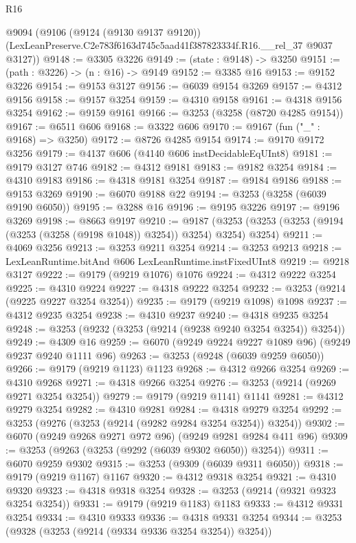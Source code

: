 \begin{lexlean}{R16}
\begin{coremodule}
  @9094
    (@9106
      (@9124 (@9130 @9137 @9120))
      (LexLeanPreserve.C2e783f6163d745c5aad41f387823334f.R16.__rel_37 @9037 @3127))
@9148 := @3305 @3226
@9149 := (state : @9148) -> @3250
@9151 := (path : @3226) -> (n : @16) -> @9149
@9152 := @3385 @16
@9153 := @9152 @3226
@9154 := @9153 @3127
@9156 := @6039 @9154 @3269
@9157 := @4312 @9156
@9158 := @9157 @3254
@9159 := @4310 @9158
@9161 := @4318 @9156 @3254
@9162 := @9159 @9161
@9166 := @3253 (@3258 (@8720 @4285 @9154))
@9167 := @6511 @606
@9168 := @3322 @606
@9170 := @9167 (fun ("_" : @9168) => @3250)
@9172 := @8726 @4285 @9154
@9174 := @9170 @9172 @3256
@9179 := @4137 @606 (@4140 @606 instDecidableEqUInt8)
@9181 := @9179 @3127 @746
@9182 := @4312 @9181
@9183 := @9182 @3254
@9184 := @4310 @9183
@9186 := @4318 @9181 @3254
@9187 := @9184 @9186
@9188 := @9153 @3269
@9190 := @6070 @9188 @22
@9194 := @3253 (@3258 (@6039 @9190 @6050))
@9195 := @3288 @16
@9196 := @9195 @3226
@9197 := @9196 @3269
@9198 := @8663 @9197
@9210 := @9187 (@3253 (@3253 (@3253 (@9194 (@3253 (@3258 (@9198 @1048)) @3254)) @3254) @3254) @3254)
@9211 := @4069 @3256
@9213 := @3253 @9211 @3254
@9214 := @3253 @9213
@9218 := LexLeanRuntime.bitAnd @606 LexLeanRuntime.instFixedUInt8
@9219 := @9218 @3127
@9222 := @9179 (@9219 @1076) @1076
@9224 := @4312 @9222 @3254
@9225 := @4310 @9224
@9227 := @4318 @9222 @3254
@9232 := @3253 (@9214 (@9225 @9227 @3254 @3254))
@9235 := @9179 (@9219 @1098) @1098
@9237 := @4312 @9235 @3254
@9238 := @4310 @9237
@9240 := @4318 @9235 @3254
@9248 := @3253 (@9232 (@3253 (@9214 (@9238 @9240 @3254 @3254)) @3254))
@9249 := @4309 @16
@9259 := @6070 (@9249 @9224 @9227 @1089 @96) (@9249 @9237 @9240 @1111 @96)
@9263 := @3253 (@9248 (@6039 @9259 @6050))
@9266 := @9179 (@9219 @1123) @1123
@9268 := @4312 @9266 @3254
@9269 := @4310 @9268
@9271 := @4318 @9266 @3254
@9276 := @3253 (@9214 (@9269 @9271 @3254 @3254))
@9279 := @9179 (@9219 @1141) @1141
@9281 := @4312 @9279 @3254
@9282 := @4310 @9281
@9284 := @4318 @9279 @3254
@9292 := @3253 (@9276 (@3253 (@9214 (@9282 @9284 @3254 @3254)) @3254))
@9302 := @6070 (@9249 @9268 @9271 @972 @96) (@9249 @9281 @9284 @411 @96)
@9309 := @3253 (@9263 (@3253 (@9292 (@6039 @9302 @6050)) @3254))
@9311 := @6070 @9259 @9302
@9315 := @3253 (@9309 (@6039 @9311 @6050))
@9318 := @9179 (@9219 @1167) @1167
@9320 := @4312 @9318 @3254
@9321 := @4310 @9320
@9323 := @4318 @9318 @3254
@9328 := @3253 (@9214 (@9321 @9323 @3254 @3254))
@9331 := @9179 (@9219 @1183) @1183
@9333 := @4312 @9331 @3254
@9334 := @4310 @9333
@9336 := @4318 @9331 @3254
@9344 := @3253 (@9328 (@3253 (@9214 (@9334 @9336 @3254 @3254)) @3254))

\end{coremodule}
\end{lexlean}

